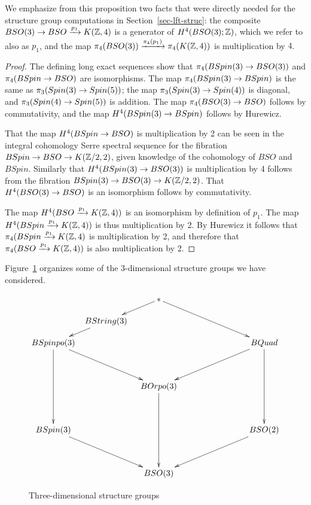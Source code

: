 \documentclass{amsart}
\begin{document}
We emphasize from this proposition two facts that were directly needed for the structure group computations in Section~\ref{sec-lft-struc}: the composite $BSO(3) \rightarrow BSO \xrightarrow{p_1} K(\mathbb Z,4)$ is a generator of $H^4(BSO(3);\mathbb Z)$, which we refer to also as $p_1$, and the map $\pi_4(BSO(3)) \xrightarrow{\pi_4(p_1)} \pi_4(K(\mathbb Z,4))$ is multiplication by $4$.

\begin{proof}
The defining long exact sequences show that $\pi_4(BSpin(3) \rightarrow BSO(3))$ and $\pi_4(BSpin \rightarrow BSO)$ are isomorphisms.  The map $\pi_4(BSpin(3) \rightarrow BSpin)$ is the same as $\pi_3(Spin(3) \rightarrow Spin(5))$; the map $\pi_3(Spin(3) \rightarrow Spin(4))$ is diagonal, and $\pi_3(Spin(4) \rightarrow Spin(5))$ is addition. %
The map $\pi_4(BSO(3) \rightarrow BSO)$ follows by commutativity, and the map $H^4(BSpin(3) \rightarrow BSpin)$ follows by Hurewicz.

That the map $H^4(BSpin \rightarrow BSO)$ is multiplication by 2 can be seen in the integral cohomology Serre spectral sequence for the fibration $BSpin \rightarrow BSO \rightarrow K(\mathbb Z/2,2)$, given knowledge of the cohomology of $BSO$ and $BSpin$.  Similarly that $H^4(BSpin(3) \rightarrow BSO(3))$ is multiplication by 4 follows from the fibration $BSpin(3) \rightarrow BSO(3) \rightarrow K(\mathbb Z/2,2)$.  That $H^4(BSO(3) \rightarrow BSO)$ is an isomorphism follows by commutativity.

The map $H^4(BSO \xrightarrow{p_1} K(\mathbb Z,4))$ is an isomorphism by definition of $p_1$.  The map $H^4(BSpin \xrightarrow{p_1} K(\mathbb Z,4))$ is thus multiplication by 2.  By Hurewicz it follows that $\pi_4(BSpin \xrightarrow{p_1} K(\mathbb Z,4)$ is multiplication by 2, and therefore that $\pi_4(BSO \xrightarrow{p_1} K(\mathbb Z,4))$ is also multiplication by 2.
\end{proof}

Figure~\ref{fig-structuregroups} organizes some of the 3-dimensional structure groups we have considered.
\begin{figure}[!ht]
\begin{equation} \nn
\xymatrix@!R@!C@R=10pt@C=5pt{
&& \ast \ar[dl] \ar[ddrr] && \\
& BString(3) \ar[dl] &&& \\
BSpinpo(3) \ar[ddrr] \ar[dddd] &&&& BQuad \ar[ddll] \ar[dddd] \\
&&&& \\
&& BOrpo(3) \ar[dddd] && \\
&&&& \\
BSpin(3) \ar[ddrr] &&&& BSO(2) \ar[ddll] \\
&&&& \\
&& BSO(3) &&
}
\end{equation}
\caption{Three-dimensional structure groups} \label{fig-structuregroups}
\end{figure}
\end{document}
